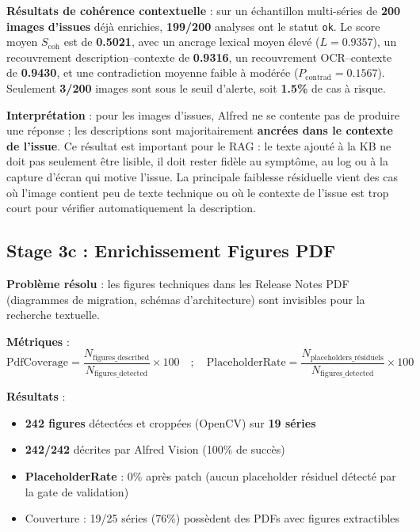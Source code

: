 \documentclass[12pt,a4paper]{report}
\begin{document}
\textbf{Résultats de cohérence contextuelle} : sur un échantillon multi-séries de \textbf{200 images d'issues} déjà enrichies, \textbf{199/200} analyses ont le statut \texttt{ok}. Le score moyen $S_{\text{coh}}$ est de \textbf{0.5021}, avec un ancrage lexical moyen élevé ($L=0.9357$), un recouvrement description--contexte de \textbf{0.9316}, un recouvrement OCR--contexte de \textbf{0.9430}, et une contradiction moyenne faible à modérée ($P_{\text{contrad}}=0.1567$). Seulement \textbf{3/200} images sont sous le seuil d'alerte, soit \textbf{1.5\%} de cas à risque.

\textbf{Interprétation} : pour les images d'issues, Alfred ne se contente pas de produire une réponse ; les descriptions sont majoritairement \textbf{ancrées dans le contexte de l'issue}. Ce résultat est important pour le RAG \cite{lewis2020rag} : le texte ajouté à la KB ne doit pas seulement être lisible, il doit rester fidèle au symptôme, au log ou à la capture d'écran qui motive l'issue. La principale faiblesse résiduelle vient des cas où l'image contient peu de texte technique ou où le contexte de l'issue est trop court pour vérifier automatiquement la description.

\subsection{Stage 3c : Enrichissement Figures PDF}
\label{sec:eval_alfred_pdf}

\textbf{Problème résolu} : les figures techniques dans les Release Notes PDF (diagrammes de migration, schémas d'architecture) sont invisibles pour la recherche textuelle.

\textbf{Métriques} :
\begin{equation}
\text{PdfCoverage} = \frac{N_{\text{figures\_described}}}{N_{\text{figures\_detected}}} \times 100 \quad ; \quad
\text{PlaceholderRate} = \frac{N_{\text{placeholders\_résiduels}}}{N_{\text{figures\_detected}}} \times 100
\end{equation}

\textbf{Résultats} :
\begin{itemize}
  \item \textbf{242 figures} détectées et croppées (OpenCV) sur \textbf{19 séries}
  \item \textbf{242/242} décrites par Alfred Vision (100\% de succès)
  \item \textbf{PlaceholderRate} : 0\% après patch (aucun placeholder résiduel détecté par la gate de validation)
  \item Couverture : 19/25 séries (76\%) possèdent des PDFs avec figures extractibles
\end{itemize}
\end{document}
